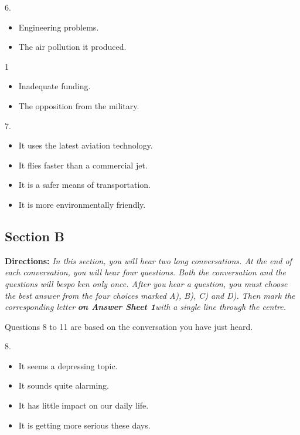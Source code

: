 \documentclass[UTF8,11pt]{ctexart}
\begin{document}
6.


\begin{itemize}[leftmargin=2em,itemsep=.2em,topsep=.4em]\item[A.] Engineering problems.
\item[B.] The air pollution it produced.
\end{itemize}

1


\begin{itemize}[leftmargin=2em,itemsep=.2em,topsep=.4em]\item[C.] Inadequate funding.
\item[D.] The opposition from the military.
\end{itemize}

7.


\begin{itemize}[leftmargin=2em,itemsep=.2em,topsep=.4em]\item[A.] It uses the latest aviation technology.
\item[B.] It flies faster than a commercial jet.
\item[C.] It is a safer means of transportation.
\item[D.] It is more environmentally friendly.
\end{itemize}

\subsection*{\textbf{Section B}}


\textbf{Directions:}\textit{ In this section, you will hear two long conversations. At the end of each} \textit{conversation, you will hear four questions. Both the conversation and the questions will bespo} \textit{ken only once. After you hear a question, you must choose the best answer from the four} \textit{choices marked A), B), C) and D). Then mark the corresponding letter}\textbf{\textit{ on Answer Sheet 1}}\textit{with} \textit{a single line through the centre.}


Questions 8 to 11 are based on the conversation you have just heard.


8.


\begin{itemize}[leftmargin=2em,itemsep=.2em,topsep=.4em]\item[A.] It seems a depressing topic.
\item[B.] It sounds quite alarming.
\item[C.] It has little impact on our daily life.
\item[D.] It is getting more serious these days.
\end{itemize}
\end{document}
